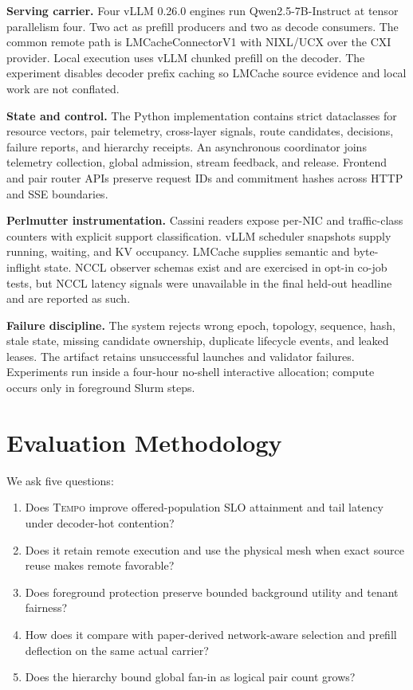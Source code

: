 \documentclass[10pt,twocolumn]{article}
\newcommand{\system}{\textsc{Tempo}\xspace}
\newcommand{\tightparagraph}[1]{\vspace{0.25em}\noindent\textbf{#1.}}
\begin{document}
\tightparagraph{Serving carrier}
Four vLLM 0.26.0 engines run Qwen2.5-7B-Instruct at tensor parallelism four.
Two act as prefill producers and two as decode consumers.  The common remote
path is LMCacheConnectorV1 with NIXL/UCX over the CXI provider.  Local execution
uses vLLM chunked prefill on the decoder.  The experiment disables decoder
prefix caching so LMCache source evidence and local work are not conflated.

\tightparagraph{State and control}
The Python implementation contains strict dataclasses for resource vectors,
pair telemetry, cross-layer signals, route candidates, decisions, failure
reports, and hierarchy receipts.  An asynchronous coordinator joins telemetry
collection, global admission, stream feedback, and release.  Frontend and pair
router APIs preserve request IDs and commitment hashes across HTTP and SSE
boundaries.

\tightparagraph{Perlmutter instrumentation}
Cassini readers expose per-NIC and traffic-class counters with explicit support
classification.  vLLM scheduler snapshots supply running, waiting, and KV
occupancy.  LMCache supplies semantic and byte-inflight state.  NCCL observer
schemas exist and are exercised in opt-in co-job tests, but NCCL latency signals
were unavailable in the final held-out headline and are reported as such.

\tightparagraph{Failure discipline}
The system rejects wrong epoch, topology, sequence, hash, stale state, missing
candidate ownership, duplicate lifecycle events, and leaked leases.  The
artifact retains unsuccessful launches and validator failures.  Experiments run
inside a four-hour no-shell interactive allocation; compute occurs only in
foreground Slurm steps.

\section{Evaluation Methodology}

We ask five questions:

\begin{enumerate}
  \item Does \system improve offered-population SLO attainment and tail latency
  under decoder-hot contention?
  \item Does it retain remote execution and use the physical mesh when exact
  source reuse makes remote favorable?
  \item Does foreground protection preserve bounded background utility and
  tenant fairness?
  \item How does it compare with paper-derived network-aware selection and
  prefill deflection on the same actual carrier?
  \item Does the hierarchy bound global fan-in as logical pair count grows?
\end{enumerate}
\end{document}
